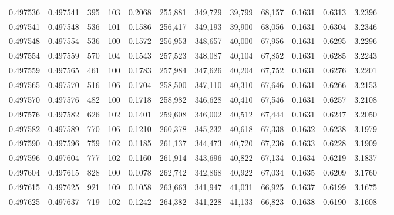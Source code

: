 \begin{tabular}{rrrrrrrrrrrrr}
0.497536 & 0.497541 &   395 & 103 &                                     0.2068 & 255,881 & 349,729 &  39,799 &  68,157 & 0.1631 & 0.6313 & 3.2396 \\
0.497541 & 0.497548 &   536 & 101 &                                     0.1586 & 256,417 & 349,193 &  39,900 &  68,056 & 0.1631 & 0.6304 & 3.2346 \\
0.497548 & 0.497554 &   536 & 100 &                                     0.1572 & 256,953 & 348,657 &  40,000 &  67,956 & 0.1631 & 0.6295 & 3.2296 \\
0.497554 & 0.497559 &   570 & 104 &                                     0.1543 & 257,523 & 348,087 &  40,104 &  67,852 & 0.1631 & 0.6285 & 3.2243 \\
0.497559 & 0.497565 &   461 & 100 &                                     0.1783 & 257,984 & 347,626 &  40,204 &  67,752 & 0.1631 & 0.6276 & 3.2201 \\
0.497565 & 0.497570 &   516 & 106 &                                     0.1704 & 258,500 & 347,110 &  40,310 &  67,646 & 0.1631 & 0.6266 & 3.2153 \\
0.497570 & 0.497576 &   482 & 100 &                                     0.1718 & 258,982 & 346,628 &  40,410 &  67,546 & 0.1631 & 0.6257 & 3.2108 \\
0.497576 & 0.497582 &   626 & 102 &                                     0.1401 & 259,608 & 346,002 &  40,512 &  67,444 & 0.1631 & 0.6247 & 3.2050 \\
0.497582 & 0.497589 &   770 & 106 &                                     0.1210 & 260,378 & 345,232 &  40,618 &  67,338 & 0.1632 & 0.6238 & 3.1979 \\
0.497590 & 0.497596 &   759 & 102 &                                     0.1185 & 261,137 & 344,473 &  40,720 &  67,236 & 0.1633 & 0.6228 & 3.1909 \\
0.497596 & 0.497604 &   777 & 102 &                                     0.1160 & 261,914 & 343,696 &  40,822 &  67,134 & 0.1634 & 0.6219 & 3.1837 \\
0.497604 & 0.497615 &   828 & 100 &                                     0.1078 & 262,742 & 342,868 &  40,922 &  67,034 & 0.1635 & 0.6209 & 3.1760 \\
0.497615 & 0.497625 &   921 & 109 &                                     0.1058 & 263,663 & 341,947 &  41,031 &  66,925 & 0.1637 & 0.6199 & 3.1675 \\
0.497625 & 0.497637 &   719 & 102 &                                     0.1242 & 264,382 & 341,228 &  41,133 &  66,823 & 0.1638 & 0.6190 & 3.1608 \\

\end{tabular}
